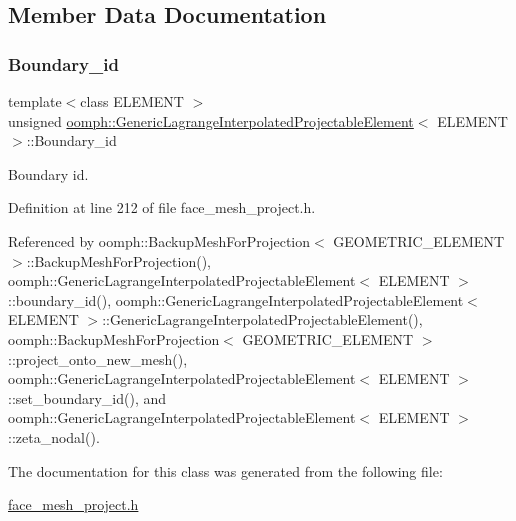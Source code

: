 \subsection{Member Data Documentation}
\mbox{\label{classoomph_1_1GenericLagrangeInterpolatedProjectableElement_a06c826acbeab80472cfcccbf72df2b19}} 
\subsubsection{\texorpdfstring{Boundary\+\_\+id}{Boundary\_id}}
{\footnotesize\ttfamily template$<$class E\+L\+E\+M\+E\+NT $>$ \\
unsigned \hyperlink{classoomph_1_1GenericLagrangeInterpolatedProjectableElement}{oomph\+::\+Generic\+Lagrange\+Interpolated\+Projectable\+Element}$<$ E\+L\+E\+M\+E\+NT $>$\+::Boundary\+\_\+id\hspace{0.3cm}{\ttfamily [private]}}



Boundary id. 



Definition at line 212 of file face\+\_\+mesh\+\_\+project.\+h.



Referenced by oomph\+::\+Backup\+Mesh\+For\+Projection$<$ G\+E\+O\+M\+E\+T\+R\+I\+C\+\_\+\+E\+L\+E\+M\+E\+N\+T $>$\+::\+Backup\+Mesh\+For\+Projection(), oomph\+::\+Generic\+Lagrange\+Interpolated\+Projectable\+Element$<$ E\+L\+E\+M\+E\+N\+T $>$\+::boundary\+\_\+id(), oomph\+::\+Generic\+Lagrange\+Interpolated\+Projectable\+Element$<$ E\+L\+E\+M\+E\+N\+T $>$\+::\+Generic\+Lagrange\+Interpolated\+Projectable\+Element(), oomph\+::\+Backup\+Mesh\+For\+Projection$<$ G\+E\+O\+M\+E\+T\+R\+I\+C\+\_\+\+E\+L\+E\+M\+E\+N\+T $>$\+::project\+\_\+onto\+\_\+new\+\_\+mesh(), oomph\+::\+Generic\+Lagrange\+Interpolated\+Projectable\+Element$<$ E\+L\+E\+M\+E\+N\+T $>$\+::set\+\_\+boundary\+\_\+id(), and oomph\+::\+Generic\+Lagrange\+Interpolated\+Projectable\+Element$<$ E\+L\+E\+M\+E\+N\+T $>$\+::zeta\+\_\+nodal().



The documentation for this class was generated from the following file\+:\begin{DoxyCompactItemize}
\item 
\hyperlink{face__mesh__project_8h}{face\+\_\+mesh\+\_\+project.\+h}\end{DoxyCompactItemize}

